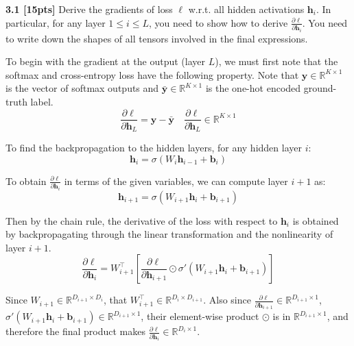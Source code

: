 \documentclass{article}
\begin{document}
\noindent
\textbf{3.1 [15pts]} Derive the gradients of loss $\ell$ w.r.t. all hidden activations $\textbf{h}_i$. In particular, for any layer $1 \leq i \leq L$, you need to show how to derive $\frac{\partial \ell}{\partial \textbf{h}_i}$. You need to write down the shapes of all tensors involved in the final expressions.\\

{\color{blue}
To begin with the gradient at the output (layer $L$), we must first note that the softmax and cross-entropy loss have the following property. Note that $\textbf{y} \in \mathbb{R}^{K \times 1}$ is the vector of softmax outputs and $\bar{\textbf{y}} \in \mathbb{R}^{K \times 1}$ is the one-hot encoded ground-truth label. 
\begin{equation}
    \frac{\partial \ell}{\partial \textbf{h}_L}= \textbf{y}- \bar{\textbf{y}} \quad \frac{\partial \ell}{\partial \textbf{h}_L} \in \mathbb{R}^{K \times 1}
\end{equation}

To find the backpropagation to the hidden layers, for any hidden layer $i$:
\begin{equation}
    \textbf{h}_i= \sigma(W_i \textbf{h}_{i-1}+ \textbf{b}_i)
\end{equation}

To obtain $\frac{\partial \ell}{\partial \textbf{h}_i}$ in terms of the given variables, we can compute layer $i+1$ as:
\begin{equation}
    \textbf{h}_{i+1}= \sigma(W_{i+1} \textbf{h}_{i}+ \textbf{b}_{i+1})
\end{equation}

Then by the chain rule, the derivative of the loss with respect to $\textbf{h}_i$ is obtained by backpropagating through the linear transformation and the nonlinearity of layer $i+1$. 
\begin{equation}
    \frac{\partial \ell}{\partial \textbf{h}_i}= W_{i+1}^{\top} \left[\frac{\partial \ell}{\partial \textbf{h}_{i+1}} \odot \sigma ' (W_{i+1} \textbf{h}_i+ \textbf{b}_{i+1}) \right]
\end{equation}

Since $W_{i+1} \in \mathbb{R}^{D_{i+1} \times D_i}$, that $W_{i+1}^{\top} \in \mathbb{R}^{D_{i} \times D_{i+1}}$. Also since $\frac{\partial \ell}{\partial \textbf{h}_{i+1}} \in \mathbb{R}^{D_{i+1} \times 1}$, $\sigma ' (W_{i+1} \textbf{h}_i+ \textbf{b}_{i+1}) \in \mathbb{R}^{D_{i+1} \times 1}$, their element-wise product $\odot$ is in $\mathbb{R}^{D_{i+1} \times 1}$, and therefore the final product makes $\frac{\partial \ell}{\partial \textbf{h}_i} \in \mathbb{R}^{D_i \times 1}$.
}\\
\end{document}
